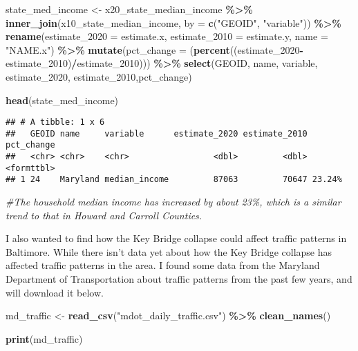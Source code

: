 \documentclass[
]{article}
\newenvironment{Shaded}{\begin{snugshade}}{\end{snugshade}}
\newcommand{\AttributeTok}[1]{\textcolor[rgb]{0.13,0.29,0.53}{#1}}
\newcommand{\CommentTok}[1]{\textcolor[rgb]{0.56,0.35,0.01}{\textit{#1}}}
\newcommand{\FunctionTok}[1]{\textcolor[rgb]{0.13,0.29,0.53}{\textbf{#1}}}
\newcommand{\NormalTok}[1]{#1}
\newcommand{\OtherTok}[1]{\textcolor[rgb]{0.56,0.35,0.01}{#1}}
\newcommand{\SpecialCharTok}[1]{\textcolor[rgb]{0.81,0.36,0.00}{\textbf{#1}}}
\newcommand{\StringTok}[1]{\textcolor[rgb]{0.31,0.60,0.02}{#1}}
\begin{document}
\begin{Shaded}
\begin{Highlighting}[]
\NormalTok{state\_med\_income }\OtherTok{\textless{}{-}}\NormalTok{ x20\_state\_median\_income }\SpecialCharTok{\%\textgreater{}\%} 
  \FunctionTok{inner\_join}\NormalTok{(x10\_state\_median\_income, }\AttributeTok{by =} \FunctionTok{c}\NormalTok{(}\StringTok{"GEOID"}\NormalTok{, }\StringTok{"variable"}\NormalTok{)) }\SpecialCharTok{\%\textgreater{}\%} 
  \FunctionTok{rename}\NormalTok{(}\AttributeTok{estimate\_2020 =}\NormalTok{ estimate.x, }
         \AttributeTok{estimate\_2010 =}\NormalTok{ estimate.y,}
         \AttributeTok{name =} \StringTok{"NAME.x"}\NormalTok{) }\SpecialCharTok{\%\textgreater{}\%}
  \FunctionTok{mutate}\NormalTok{(}\AttributeTok{pct\_change =}\NormalTok{ (}\FunctionTok{percent}\NormalTok{((estimate\_2020}\SpecialCharTok{{-}}\NormalTok{estimate\_2010)}\SpecialCharTok{/}\NormalTok{estimate\_2010))) }\SpecialCharTok{\%\textgreater{}\%} 
  \FunctionTok{select}\NormalTok{(GEOID, name, variable, estimate\_2020, estimate\_2010,pct\_change)}

\FunctionTok{head}\NormalTok{(state\_med\_income)}
\end{Highlighting}
\end{Shaded}

\begin{verbatim}
## # A tibble: 1 x 6
##   GEOID name     variable      estimate_2020 estimate_2010 pct_change
##   <chr> <chr>    <chr>                 <dbl>         <dbl> <formttbl>
## 1 24    Maryland median_income         87063         70647 23.24%
\end{verbatim}

\begin{Shaded}
\begin{Highlighting}[]
\CommentTok{\#The household median income has increased by about 23\%, which is a similar trend to that in Howard and Carroll Counties.}
\end{Highlighting}
\end{Shaded}

I also wanted to find how the Key Bridge collapse could affect traffic
patterns in Baltimore. While there isn't data yet about how the Key
Bridge collapse has affected traffic patterns in the area. I found some
data from the Maryland Department of Transportation about traffic
patterns from the past few years, and will download it below.

\begin{Shaded}
\begin{Highlighting}[]
\NormalTok{md\_traffic }\OtherTok{\textless{}{-}} \FunctionTok{read\_csv}\NormalTok{(}\StringTok{"mdot\_daily\_traffic.csv"}\NormalTok{) }\SpecialCharTok{\%\textgreater{}\%} 
  \FunctionTok{clean\_names}\NormalTok{()}

\FunctionTok{print}\NormalTok{(md\_traffic)}
\end{Highlighting}
\end{Shaded}
\end{document}
